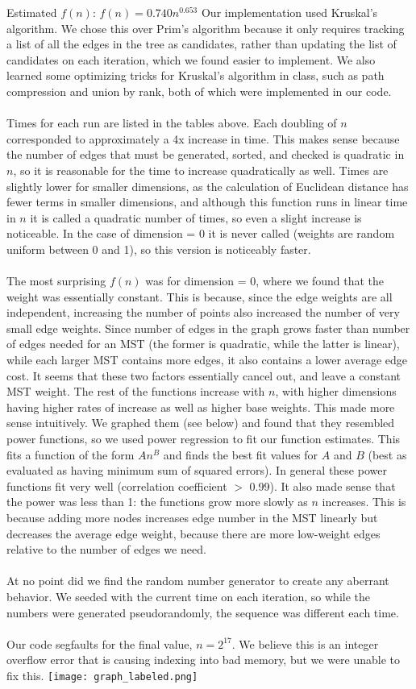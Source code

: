 \documentclass[11pt]{article}
\begin{document}
	Estimated $f(n)$: $f(n) = 0.740n^{0.653}$
\newpage	
\noindent Our implementation used Kruskal's algorithm. We chose this over Prim's algorithm because it only requires tracking a list of all the edges in the tree as candidates, rather than updating the list of candidates on each iteration, which we found easier to implement. We also learned some optimizing tricks for Kruskal's algorithm in class, such as path compression and union by rank, both of which were implemented in our code.\\
\\
Times for each run are listed in the tables above. Each doubling of $n$ corresponded to approximately a 4x increase in time. This makes sense because the number of edges that must be generated, sorted, and checked is quadratic in $n$, so it is reasonable for the time to increase quadratically as well. Times are slightly lower for smaller dimensions, as the calculation of Euclidean distance has fewer terms in smaller dimensions, and although this function runs in linear time in $n$ it is called a quadratic number of times, so even a slight increase is noticeable. In the case of dimension = 0 it is never called (weights are random uniform between 0 and 1), so this version is noticeably faster.\\
\\
The most surprising $f(n)$ was for dimension = 0, where we found that the weight was essentially constant. This is because, since the edge weights are all independent, increasing the number of points also increased the number of very small edge weights. Since number of edges in the graph grows faster than number of edges needed for an MST (the former is quadratic, while the latter is linear), while each larger MST contains more edges, it also contains a lower average edge cost. It seems that these two factors essentially cancel out, and leave a constant MST weight. The rest of the functions increase with $n$, with higher dimensions having higher rates of increase as well as higher base weights. This made more sense intuitively. We graphed them (see below) and found that they resembled power functions, so we used power regression to fit our function estimates. This fits a function of the form $An^B$ and finds the best fit values for $A$ and $B$ (best as evaluated as having minimum sum of squared errors). In general these power functions fit very well (correlation coefficient $>$ 0.99). It also made sense that the power was less than 1: the functions grow more slowly as $n$ increases. This is because adding more nodes increases edge number in the MST linearly but decreases the average edge weight, because there are more low-weight edges relative to the number of edges we need.
\\
\\
At no point did we find the random number generator to create any aberrant behavior. We seeded with the current time on each iteration, so while the numbers were generated pseudorandomly, the sequence was different each time.
\\\\
Our code segfaults for the final value, $n=2^17$. We believe this is an integer overflow error that is causing indexing into bad memory, but we were unable to fix this.
\newpage
\texttt{[image: graph\_labeled.png]}
\end{document}
